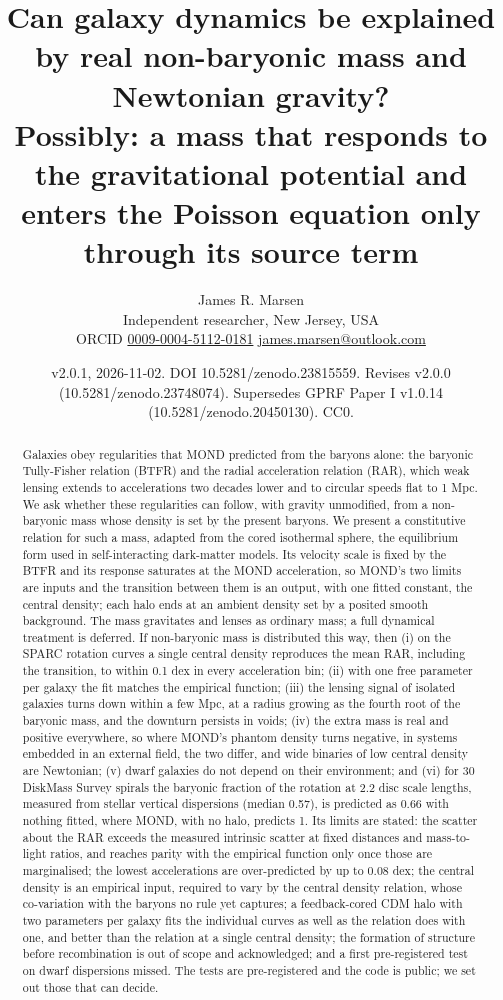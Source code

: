 \documentclass[
  10pt,
]{article}
\title{Can galaxy dynamics be explained by real non-baryonic mass and Newtonian gravity?\\[0.6ex]{\large Possibly: a mass that responds to the gravitational potential and enters the Poisson equation only through its source term}}
\author{James R. Marsen\\[2pt]
  {\normalsize Independent researcher, New Jersey, USA}\\[2pt]
  {\normalsize ORCID \href{https://orcid.org/0009-0004-5112-0181}{0009-0004-5112-0181}
   \quad \href{mailto:james.marsen@outlook.com}{james.marsen@outlook.com}}}
\date{v2.0.1, 2026-11-02. DOI 10.5281/zenodo.23815559. Revises v2.0.0 (10.5281/zenodo.23748074). Supersedes GPRF Paper I v1.0.14 (10.5281/zenodo.20450130). CC0.}
\begin{document}
\maketitle

\begin{abstract}
Galaxies obey regularities that MOND predicted from the baryons alone: the baryonic Tully-Fisher relation (BTFR) and the radial acceleration relation (RAR), which weak lensing extends to accelerations two decades lower and to circular speeds flat to 1 Mpc. We ask whether these regularities can follow, with gravity unmodified, from a non-baryonic mass whose density is set by the present baryons. We present a constitutive relation for such a mass, adapted from the cored isothermal sphere, the equilibrium form used in self-interacting dark-matter models. Its velocity scale is fixed by the BTFR and its response saturates at the MOND acceleration, so MOND's two limits are inputs and the transition between them is an output, with one fitted constant, the central density; each halo ends at an ambient density set by a posited smooth background. The mass gravitates and lenses as ordinary mass; a full dynamical treatment is deferred. If non-baryonic mass is distributed this way, then (i) on the SPARC rotation curves a single central density reproduces the mean RAR, including the transition, to within 0.1 dex in every acceleration bin; (ii) with one free parameter per galaxy the fit matches the empirical function; (iii) the lensing signal of isolated galaxies turns down within a few Mpc, at a radius growing as the fourth root of the baryonic mass, and the downturn persists in voids; (iv) the extra mass is real and positive everywhere, so where MOND's phantom density turns negative, in systems embedded in an external field, the two differ, and wide binaries of low central density are Newtonian; (v) dwarf galaxies do not depend on their environment; and (vi) for 30 DiskMass Survey spirals the baryonic fraction of the rotation at 2.2 disc scale lengths, measured from stellar vertical dispersions (median 0.57), is predicted as 0.66 with nothing fitted, where MOND, with no halo, predicts 1. Its limits are stated: the scatter about the RAR exceeds the measured intrinsic scatter at fixed distances and mass-to-light ratios, and reaches parity with the empirical function only once those are marginalised; the lowest accelerations are over-predicted by up to 0.08 dex; the central density is an empirical input, required to vary by the central density relation, whose co-variation with the baryons no rule yet captures; a feedback-cored CDM halo with two parameters per galaxy fits the individual curves as well as the relation does with one, and better than the relation at a single central density; the formation of structure before recombination is out of scope and acknowledged; and a first pre-registered test on dwarf dispersions missed. The tests are pre-registered and the code is public; we set out those that can decide.
\end{abstract}
\end{document}
